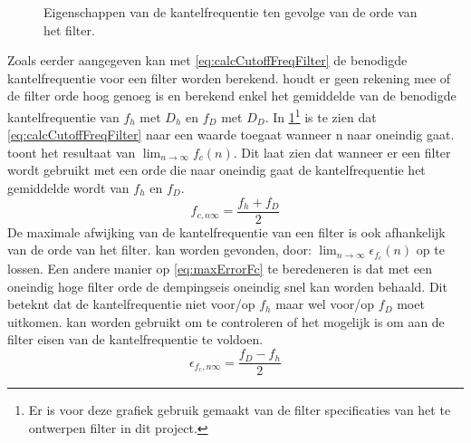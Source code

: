 \begin{figure}[!htb]
    \centering
    
    \caption{Eigenschappen van de kantelfrequentie ten gevolge van de orde van het filter.}
    \label{fig:fcEigenschappenTengevolgeVanN}
\end{figure}
Zoals eerder aangegeven kan met \cref{eq:calcCutoffFreqFilter} de benodigde kantelfrequentie voor een filter worden berekend.  houdt er geen rekening mee of de filter orde hoog genoeg is en berekend enkel het gemiddelde van de benodigde kantelfrequentie van $f_h$ met $D_h$ en $f_D$ met $D_D$. In \cref{fig:fcEigenschappenTengevolgeVanN}\footnote{Er is voor deze grafiek gebruik gemaakt van de filter specificaties van het te ontwerpen filter in dit project.} is te zien dat \cref{eq:calcCutoffFreqFilter} naar een waarde toegaat wanneer n naar oneindig gaat.  toont het resultaat van $\lim_{n\rightarrow\infty}f_c\left(n\right)$. Dit laat zien dat wanneer er een filter wordt gebruikt met een orde die naar oneindig gaat de kantelfrequentie het gemiddelde wordt van $f_h$ en $f_D$.
\begin{equation}\label{eq:limietCutoffFreqNtoInfty}
    f_{c,n\infty}=\frac{f_h+f_D}{2}
\end{equation}
De maximale afwijking van de kantelfrequentie van een filter is ook afhankelijk van de orde van het filter.  kan worden gevonden, door: $\lim_{n\rightarrow\infty}\epsilon_{f_c}\left(n\right)$ op te lossen. Een andere manier op \cref{eq:maxErrorFc} te beredeneren is dat met een oneindig hoge filter orde de dempingseis oneindig snel kan worden behaald. Dit beteknt dat de kantelfrequentie niet voor/op $f_h$ maar wel voor/op $f_D$ moet uitkomen.  kan worden gebruikt om te controleren of het mogelijk is om aan de filter eisen van de kantelfrequentie te voldoen.
\begin{equation}\label{eq:maxErrorFc}
    \epsilon_{f_c,n\infty}=\frac{f_D-f_h}{2}
\end{equation}



